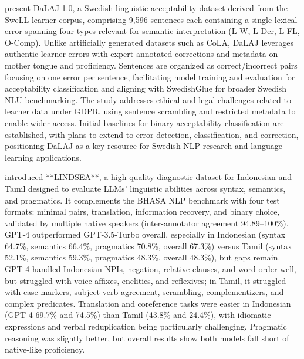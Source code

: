 \documentclass[acmsmall]{acmart}
\begin{document}
\citep{volodina-etal-2021-dalaj} present DaLAJ 1.0, a Swedish linguistic acceptability dataset derived from the SweLL learner corpus, comprising 9,596 sentences each containing a single lexical error spanning four types relevant for semantic interpretation (L-W, L-Der, L-FL, O-Comp). Unlike artificially generated datasets such as CoLA, DaLAJ leverages authentic learner errors with expert-annotated corrections and metadata on mother tongue and proficiency. Sentences are organized as correct/incorrect pairs focusing on one error per sentence, facilitating model training and evaluation for acceptability classification and aligning with SwedishGlue for broader Swedish NLU benchmarking. The study addresses ethical and legal challenges related to learner data under GDPR, using sentence scrambling and restricted metadata to enable wider access. Initial baselines for binary acceptability classification are established, with plans to extend to error detection, classification, and correction, positioning DaLAJ as a key resource for Swedish NLP research and language learning applications.

\citep{leong2023bhasaholisticsoutheastasian} introduced **LINDSEA**, a high-quality diagnostic dataset for Indonesian and Tamil designed to evaluate LLMs’ linguistic abilities across syntax, semantics, and pragmatics. It complements the BHASA NLP benchmark with four test formats: minimal pairs, translation, information recovery, and binary choice, validated by multiple native speakers (inter-annotator agreement 94.89–100\%). GPT-4 outperformed GPT-3.5-Turbo overall, especially in Indonesian (syntax 64.7\%, semantics 66.4\%, pragmatics 70.8\%, overall 67.3\%) versus Tamil (syntax 52.1\%, semantics 59.3\%, pragmatics 48.3\%, overall 48.3\%), but gaps remain. GPT-4 handled Indonesian NPIs, negation, relative clauses, and word order well, but struggled with voice affixes, enclitics, and reflexives; in Tamil, it struggled with case markers, subject-verb agreement, scrambling, complementizers, and complex predicates. Translation and coreference tasks were easier in Indonesian (GPT-4 69.7\% and 74.5\%) than Tamil (43.8\% and 24.4\%), with idiomatic expressions and verbal reduplication being particularly challenging. Pragmatic reasoning was slightly better, but overall results show both models fall short of native-like proficiency.
\end{document}
